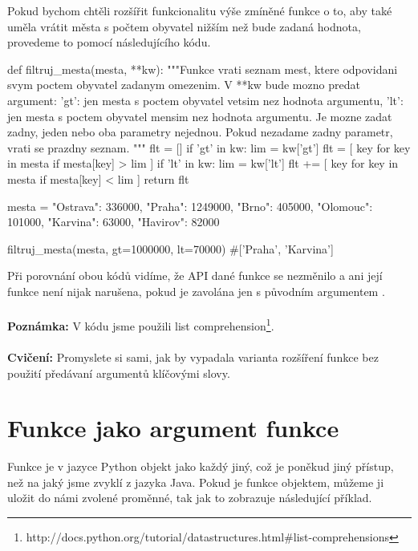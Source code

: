 Pokud bychom chtěli rozšířit funkcionalitu výše zmíněné funkce o to, aby také uměla vrátit města
s počtem obyvatel nižším než bude zadaná hodnota, provedeme to pomocí následujícího kódu.

\begin{python}
def filtruj_mesta(mesta, **kw):
    """Funkce vrati seznam mest, ktere odpovidani svym
    poctem obyvatel zadanym omezenim.
    V **kw bude mozno predat argument:
     'gt': jen mesta s poctem obyvatel vetsim nez hodnota
           argumentu,
     'lt': jen mesta s poctem obyvatel mensim nez hodnota
           argumentu.
    Je mozne zadat zadny, jeden nebo oba parametry nejednou.
    Pokud nezadame zadny parametr, vrati se prazdny seznam.
    """
    flt = []
    if 'gt' in kw:
        lim = kw['gt']
        flt = [ key for key in mesta if mesta[key] > lim ]
    if 'lt' in kw:
        lim = kw['lt']
        flt += [ key for key in mesta if mesta[key] < lim ]
    return flt

mesta = {"Ostrava": 336000, "Praha": 1249000,
         "Brno": 405000, "Olomouc": 101000,
         "Karvina": 63000, "Havirov": 82000}

filtruj_mesta(mesta, gt=1000000, lt=70000)
#['Praha', 'Karvina']
\end{python}

Při porovnání obou kódů vidíme, že API dané funkce se nezměnilo a ani její funkce není nijak narušena,
pokud je zavolána jen s původním argumentem .
\\
\\
\noindent
{\textbf{Poznámka:}}
V kódu jsme použili list comprehension\footnote{http://docs.python.org/tutorial/datastructures.html\#list-comprehensions}.
\\
\\
\noindent
{\textbf{Cvičení:}}
Promyslete si sami, jak by vypadala varianta
rozšíření funkce bez použití předávaní argumentů klíčovými slovy.


\section{Funkce jako argument funkce}

Funkce je v jazyce Python objekt jako každý jiný, což je poněkud jiný přístup, než na jaký jsme zvyklí
z jazyka Java. Pokud je funkce objektem, můžeme ji uložit do námi zvolené proměnné, tak jak to zobrazuje
následující příklad.


